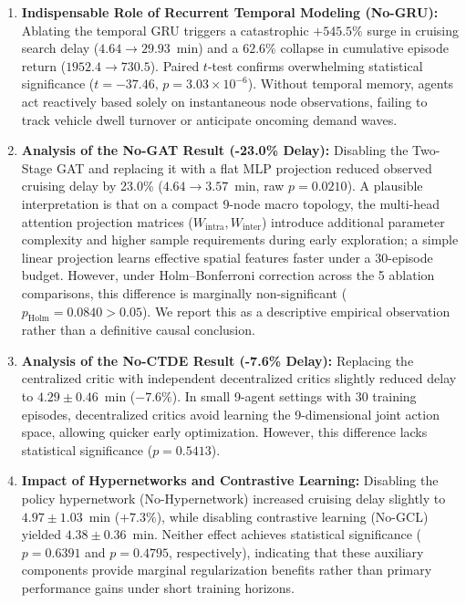 \documentclass[journal]{IEEEtran}
\begin{document}
\begin{enumerate}
    \item \textbf{Indispensable Role of Recurrent Temporal Modeling (No-GRU):} Ablating the temporal GRU triggers a catastrophic $+545.5\%$ surge in cruising search delay ($4.64 \to 29.93$~min) and a $62.6\%$ collapse in cumulative episode return ($1952.4 \to 730.5$). Paired $t$-test confirms overwhelming statistical significance ($t = -37.46, \, p = 3.03 \times 10^{-6}$). Without temporal memory, agents act reactively based solely on instantaneous node observations, failing to track vehicle dwell turnover or anticipate oncoming demand waves.
    \item \textbf{Analysis of the No-GAT Result (-23.0\% Delay):} Disabling the Two-Stage GAT and replacing it with a flat MLP projection reduced observed cruising delay by 23.0\% ($4.64 \to 3.57$~min, raw $p = 0.0210$). A plausible interpretation is that on a compact 9-node macro topology, the multi-head attention projection matrices ($W_{\text{intra}}, W_{\text{inter}}$) introduce additional parameter complexity and higher sample requirements during early exploration; a simple linear projection learns effective spatial features faster under a 30-episode budget. However, under Holm--Bonferroni correction across the 5 ablation comparisons, this difference is marginally non-significant ($p_{\text{Holm}} = 0.0840 > 0.05$). We report this as a descriptive empirical observation rather than a definitive causal conclusion.
    \item \textbf{Analysis of the No-CTDE Result (-7.6\% Delay):} Replacing the centralized critic with independent decentralized critics slightly reduced delay to $4.29 \pm 0.46$~min ($-7.6\%$). In small 9-agent settings with 30 training episodes, decentralized critics avoid learning the 9-dimensional joint action space, allowing quicker early optimization. However, this difference lacks statistical significance ($p = 0.5413$).
    \item \textbf{Impact of Hypernetworks and Contrastive Learning:} Disabling the policy hypernetwork (No-Hypernetwork) increased cruising delay slightly to $4.97 \pm 1.03$~min ($+7.3\%$), while disabling contrastive learning (No-GCL) yielded $4.38 \pm 0.36$~min. Neither effect achieves statistical significance ($p = 0.6391$ and $p = 0.4795$, respectively), indicating that these auxiliary components provide marginal regularization benefits rather than primary performance gains under short training horizons.
\end{enumerate}
\end{document}
